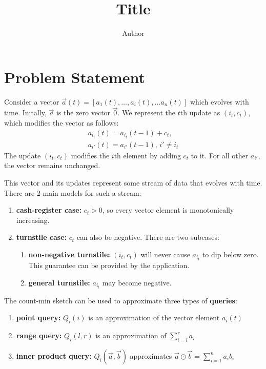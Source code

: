 \documentclass[11pt]{article}
\title{Title}
\author{Author}
\newcommand{\sq}{\mathit{Q}_i}
\begin{document}
\maketitle
\section{Problem Statement}
Consider a vector $\vec{a}(t) = [a_1(t), \dots, a_i(t), \dots a_n(t)]$ which evolves with time.
Initally, $\vec{a}$ is the zero vector $\vec{0}$.  We represent the $t$th update as $(i_t, c_t)$,
which modifies the vector as follows:
\begin{align}
    a_{i_t}(t) = a_{i_t}(t - 1) + c_t, \\
    a_{i'}(t) = a_{i'}(t - 1), \, i' \neq i_t
\end{align}
The update $(i_t, c_t)$ modifies the $i$th element by adding $c_t$ to it.
For all other $a_{i'}$, the vector remains unchanged. 

This vector and its updates represent some stream of 
data that evolves with time.  There are 2 main models for such a stream:
\begin{enumerate}
    \item \textbf{cash-register case:} $c_t > 0$, so every vector element is monotonically
    increasing.
    \item \textbf{turnstile case:} $c_t$ can also be negative.  There are two subcases:
    \begin{enumerate}
        \item \textbf{non-negative turnstile:} $(i_t, c_t)$ will never cause $a_{i_t}$ to dip
        below zero. This guarantee can be provided by the application.
        \item \textbf{general turnstile:} $a_{i_t}$ may become negative.
    \end{enumerate}
\end{enumerate}
\noindent
The count-min sketch can be used to approximate three types of \textbf{queries}:
\begin{enumerate}
    \item \textbf{point query:} $\sq(i)$ is an approximation of the vector 
    element $a_i(t)$
    \item \textbf{range query:} $\sq(l, r)$ is an approximation of 
    $\sum_{i = l}^{r}a_i$. 
    \item \textbf{inner product query:} $\sq(\vec{a}, \vec{b})$ approximates
    $\vec{a} \odot \vec{b} = \sum_{i = 1}^{n} a_i b_i$
\end{enumerate}
\end{document}
